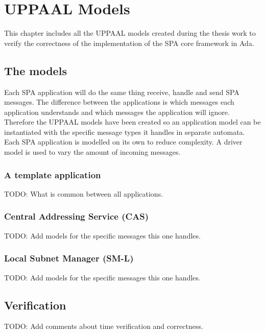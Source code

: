 \chapter{UPPAAL Models}\label{ch:uppaal_models}
This chapter includes all the UPPAAL models created during the thesis work to
verify the correctness of the implementation of the SPA core framework in Ada.

\section{The models}
Each SPA application will do the same thing receive, handle and send SPA
messages. The difference between the applications is which messages each
application understands and which messages the application will ignore.
Therefore the UPPAAL models have been created so an application model can be
instantiated with the specific message types it handles in separate automata.
Each SPA application is modelled on its own to reduce complexity. A driver
model is used to vary the amount of incoming messages.

\subsection{A template application}
TODO: What is common between all applications.

\subsection{Central Addressing Service (CAS)}
TODO: Add models for the specific messages this one handles.

\subsection{Local Subnet Manager (SM-L)}
TODO: Add models for the specific messages this one handles.

\section{Verification}
TODO: Add comments about time verification and correctness.
